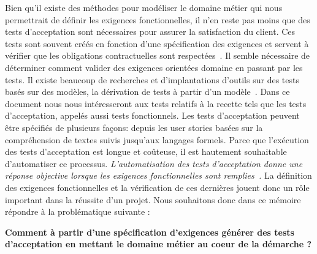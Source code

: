 Bien qu'il existe des méthodes pour modéliser le domaine métier qui nous permettrait de définir les exigences fonctionnelles, il n'en reste pas moins que des tests d'acceptation sont nécessaires pour assurer la satisfaction du client. Ces tests sont souvent créés en fonction d'une spécification des exigences et servent à vérifier que les obligations contractuelles sont respectées~\cite{article6}. Il semble nécessaire de déterminer comment valider des exigences orientées domaine en passant par les tests. 
Il existe beaucoup de recherches et d'implantations d'outils sur des tests basés sur des modèles, la dérivation de tests à partir d'un modèle~\cite{article7}. Dans ce document nous nous intéresseront aux tests relatifs à la recette tels que les tests d'acceptation, appelés aussi tests fonctionnels. Les tests d'acceptation peuvent être spécifiés de plusieurs façons: depuis les user stories basées sur la compréhension de textes suivis jusqu'aux langages formels. Parce que l'exécution des tests d'acceptation est longue et coûteuse, il est hautement souhaitable d'automatiser ce processus. \textit{L'automatisation des tests d'acceptation donne une réponse objective lorsque les exigences fonctionnelles sont remplies~\cite{article6}.} La définition des exigences fonctionnelles et la vérification de ces dernières jouent donc un rôle important dans la réussite d'un projet. Nous souhaitons donc dans ce mémoire répondre à la problématique suivante : 

  \textbf{Comment à partir d'une spécification d'exigences générer des tests d'acceptation en mettant le domaine métier au coeur de la démarche ? }